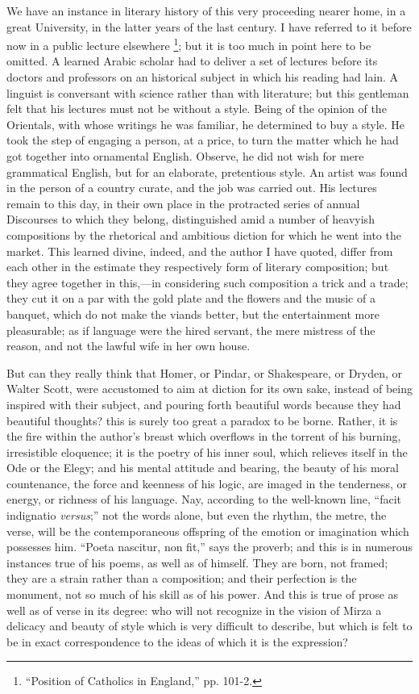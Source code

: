 We have an instance in literary history of this very proceeding
nearer home, in a great University, in the latter years of the last
century. I have referred to it before now in a public lecture
elsewhere \footnote{``Position
of Catholics in England,'' pp. 101-2.}; but it is too much in point here to be omitted. A learned
Arabic scholar had to deliver a set of lectures before its doctors and
professors on an historical subject in which his reading had lain. A
linguist is conversant with science rather than with literature; but
this gentleman felt that his lectures must not be without a style.
Being of the opinion of the Orientals, with whose writings he was
familiar, he determined to buy a style. He took the step of engaging a
person, at a price, to turn the matter which he had got together into
ornamental English. Observe, he did not wish for mere grammatical
English, but for an elaborate, pretentious style. An artist was found
in the person of a country curate, and the job was carried out. His
lectures remain to this day, in their own place in the protracted
series of annual Discourses to which they belong, distinguished amid a
number of heavyish compositions by the rhetorical and ambitious
diction for which he went into the market. This learned divine,
indeed, and the author I have quoted, differ from each other in the
estimate they respectively form of literary composition; but they
agree together in this,—in considering such composition a trick and
a trade; they cut it on a par with the gold plate and the flowers and
the music of a banquet, which do not make the viands better, but
the entertainment more pleasurable; as if language were the hired
servant, the mere mistress of the reason, and not the lawful wife in
her own house.

But can they really think that Homer, or Pindar, or Shakespeare, or
Dryden, or Walter Scott, were accustomed to aim at diction for its own
sake, instead of being inspired with their subject, and pouring forth
beautiful words because they had beautiful thoughts? this is surely
too great a paradox to be borne. Rather, it is the fire within the
author's breast which overflows in the torrent of his burning,
irresistible eloquence; it is the poetry of his inner soul, which
relieves itself in the Ode or the Elegy; and his mental attitude and
bearing, the beauty of his moral countenance, the force and keenness
of his logic, are imaged in the tenderness, or energy, or richness of
his language. Nay, according to the well-known line, ``facit
indignatio \emph{versus};'' not the words alone, but even the
rhythm, the metre, the verse, will be the contemporaneous offspring of
the emotion or imagination which possesses him. ``Poeta nascitur,
non fit,'' says the proverb; and this is in numerous instances
true of his poems, as well as of himself. They are born, not framed;
they are a strain rather than a composition; and their perfection is
the monument, not so much of his skill as of his power. And this is
true of prose as well as of verse in its degree: who will not
recognize in the vision of Mirza a delicacy and beauty of style which
is very difficult to describe, but which is felt to be in exact
correspondence to the ideas of which it is the expression?

